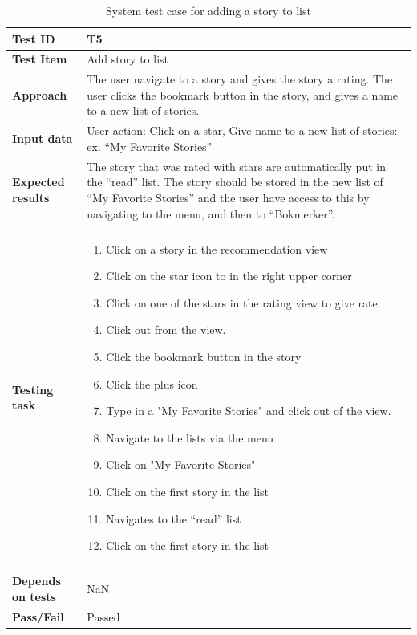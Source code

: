 \begin{appendices}
\begin{table}[H]
	\label{Tab:systemTesting4}
	\end{table}


	\begin{table}[H]
		\centering
		\caption{System test case for adding a story to list}
		\begin{tabular}{ | l | l  |}
			\hline 
			\textbf{Test ID} & T5  \\ \hline
			\textbf{Test Item}  & Add story to list	 \\ \hline
			\textbf{Approach} & \begin{minipage}{5in}The user navigate to a story and gives the story a rating. The user clicks the bookmark button in the story, and gives a name to a new list of stories.   \end{minipage}\\ \hline
			\textbf{Input data} & \begin{minipage}{5in}User action: Click on a star, Give name to a new list of stories: ex. “My Favorite Stories” \end{minipage}\\ \hline
			\textbf{Expected results} & \begin{minipage}{5in}The story that was rated with stars are automatically put in the “read” list. The story should be stored in the new list of “My Favorite Stories” and the user have access to this by navigating to the menu, and then to “Bokmerker”. \end{minipage}\\ \hline&\\[-3.8ex]
			\textbf{Testing task} & \begin{minipage}{5in}
			\begin{enumerate}[noitemsep]
			\item Click on a story in the recommendation view 
			\item Click on the star icon to in the right upper corner 
			\item Click on one of the stars in the rating view to give rate.
			\item Click out from the view. 
			\item Click the bookmark button in the story 
			\item Click the plus icon
			\item Type in a "My Favorite Stories" and click out of the view.
			\item Navigate to the lists via the menu
			\item Click on "My Favorite Stories"
			\item Click on the first story in the list
			\item Navigates to the “read” list
			\item Click on the first story in the list
			\end{enumerate}\end{minipage}
			\\ &\\[-3.8ex]\hline
			\textbf{Depends on tests} & NaN \\ \hline			
			\textbf{Pass/Fail} & Passed \\\hline		
		\end{tabular}
	

\end{table}
\end{appendices}
